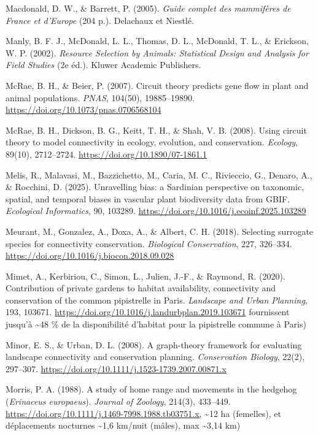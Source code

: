 \documentclass[a4paper,11pt]{report}
\begin{document}
Macdonald, D. W., \& Barrett, P. (2005). \textit{Guide complet des mammifères de France et d'Europe} (204 p.). Delachaux et Niestlé.

Manly, B. F. J., McDonald, L. L., Thomas, D. L., McDonald, T. L., \& Erickson, W. P. (2002). \textit{Resource Selection by Animals: Statistical Design and Analysis for Field Studies} (2e éd.). Kluwer Academic Publishers.

McRae, B. H., \& Beier, P. (2007). Circuit theory predicts gene flow in plant and animal populations. \textit{PNAS}, 104(50), 19885--19890. \url{https://doi.org/10.1073/pnas.0706568104}

McRae, B. H., Dickson, B. G., Keitt, T. H., \& Shah, V. B. (2008). Using circuit theory to model connectivity in ecology, evolution, and conservation. \textit{Ecology}, 89(10), 2712--2724. \url{https://doi.org/10.1890/07-1861.1}

Melis, R., Malavasi, M., Bazzichetto, M., Caria, M. C., Rivieccio, G., Denaro, A., \& Rocchini, D. (2025). Unravelling bias: a Sardinian perspective on taxonomic, spatial, and temporal biases in vascular plant biodiversity data from GBIF. \textit{Ecological Informatics}, 90, 103289. \url{https://doi.org/10.1016/j.ecoinf.2025.103289}

Meurant, M., Gonzalez, A., Doxa, A., \& Albert, C. H. (2018). Selecting surrogate species for connectivity conservation. \textit{Biological Conservation}, 227, 326--334. \url{https://doi.org/10.1016/j.biocon.2018.09.028}

Mimet, A., Kerbiriou, C., Simon, L., Julien, J.-F., \& Raymond, R. (2020). Contribution of private gardens to habitat availability, connectivity and conservation of the common pipistrelle in Paris. \textit{Landscape and Urban Planning}, 193, 103671. \url{https://doi.org/10.1016/j.landurbplan.2019.103671} fournissent jusqu'à \textasciitilde{}48 \% de la disponibilité d'habitat pour la pipistrelle commune à Paris)

Minor, E. S., \& Urban, D. L. (2008). A graph-theory framework for evaluating landscape connectivity and conservation planning. \textit{Conservation Biology}, 22(2), 297--307. \url{https://doi.org/10.1111/j.1523-1739.2007.00871.x}

Morris, P. A. (1988). A study of home range and movements in the hedgehog (\textit{Erinaceus europaeus}). \textit{Journal of Zoology}, 214(3), 433--449. \url{https://doi.org/10.1111/j.1469-7998.1988.tb03751.x,} \textasciitilde{}12 ha (femelles), et déplacements nocturnes \textasciitilde{}1,6 km/nuit (mâles), max \textasciitilde{}3,14 km)
\end{document}
